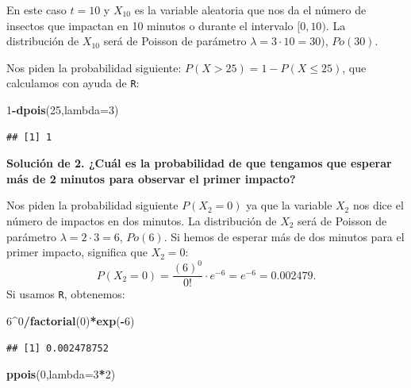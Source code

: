 \documentclass[]{book}
\newenvironment{Shaded}{\begin{snugshade}}{\end{snugshade}}
\newcommand{\DataTypeTok}[1]{\textcolor[rgb]{0.13,0.29,0.53}{#1}}
\newcommand{\DecValTok}[1]{\textcolor[rgb]{0.00,0.00,0.81}{#1}}
\newcommand{\KeywordTok}[1]{\textcolor[rgb]{0.13,0.29,0.53}{\textbf{#1}}}
\newcommand{\NormalTok}[1]{#1}
\newcommand{\OperatorTok}[1]{\textcolor[rgb]{0.81,0.36,0.00}{\textbf{#1}}}
\begin{document}
En este caso \(t=10\) y \(X_{10}\) es la variable aleatoria que nos da el número de insectos que impactan en 10 minutos o durante el intervalo \([0,10)\). La distribución de \(X_{10}\) será de Poisson de parámetro \(\lambda=3\cdot 10=30)\), \(Po(30)\).

Nos piden la probabilidad siguiente: \(P(X>25)=1-P(X\leq 25)\), que calculamos con ayuda de \texttt{R}:

\begin{Shaded}
\begin{Highlighting}[]
\DecValTok{1}\OperatorTok{-}\KeywordTok{dpois}\NormalTok{(}\DecValTok{25}\NormalTok{,}\DataTypeTok{lambda=}\DecValTok{3}\NormalTok{)}
\end{Highlighting}
\end{Shaded}

\begin{verbatim}
## [1] 1
\end{verbatim}

\textbf{Solución de 2. ¿Cuál es la probabilidad de que tengamos que esperar más de 2 minutos para observar el primer impacto?}

Nos piden la probabilidad siguiente \(P(X_2=0)\) ya que la variable \(X_2\) nos dice el número de impactos en dos minutos. La distribución de \(X_2\) será de Poisson de parámetro \(\lambda =2\cdot 3=6\), \(Po(6)\). Si hemos de esperar más de dos minutos para el primer impacto, significa que \(X_2=0\):
\[P(X_2=0)=\frac{(6)^0}{0!}\cdot e^{-6}= e^{-6}=0.002479.\]
Si usamos \texttt{R}, obtenemos:

\begin{Shaded}
\begin{Highlighting}[]
\DecValTok{6}\OperatorTok{^}\DecValTok{0}\OperatorTok{/}\KeywordTok{factorial}\NormalTok{(}\DecValTok{0}\NormalTok{)}\OperatorTok{*}\KeywordTok{exp}\NormalTok{(}\OperatorTok{-}\DecValTok{6}\NormalTok{)}
\end{Highlighting}
\end{Shaded}

\begin{verbatim}
## [1] 0.002478752
\end{verbatim}

\begin{Shaded}
\begin{Highlighting}[]
\KeywordTok{ppois}\NormalTok{(}\DecValTok{0}\NormalTok{,}\DataTypeTok{lambda=}\DecValTok{3}\OperatorTok{*}\DecValTok{2}\NormalTok{)}
\end{Highlighting}
\end{Shaded}
\end{document}
